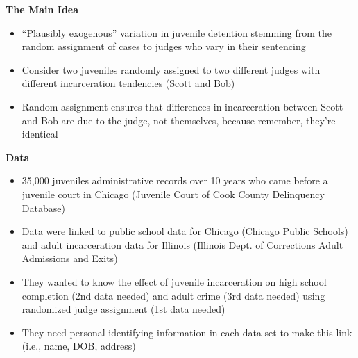\documentclass[notes=show]{beamer}
\begin{document}
\begin{frame}[plain]
\begin{center}
\textbf{The Main Idea}
\end{center}

	\begin{itemize}
	\item ``Plausibly exogenous'' variation in juvenile detention stemming from the random assignment of cases to judges who vary in their sentencing
	\item Consider two juveniles randomly assigned to two different judges with different incarceration tendencies (Scott and Bob)
	\item Random assignment ensures that differences in incarceration between Scott and Bob are due to the judge, not themselves, because remember, they're identical
	\end{itemize}
\end{frame}

\begin{frame}[plain]
\begin{center}
\textbf{Data}
\end{center}

	\begin{itemize}
	\item 35,000 juveniles administrative records over 10 years who came before a juvenile court in Chicago (Juvenile Court of Cook County Delinquency Database)
	\item Data were linked to public school data for Chicago (Chicago Public Schools) and adult incarceration data for Illinois (Illinois Dept. of Corrections Adult Admissions and Exits)
	\item They wanted to know the effect of juvenile incarceration on high school completion (2nd data needed) and adult crime (3rd data needed) using randomized judge assignment (1st data needed)
	\item They need personal identifying information in each data set to make this link (i.e., name, DOB, address)
	\end{itemize}
	
\end{frame}
\end{document}
